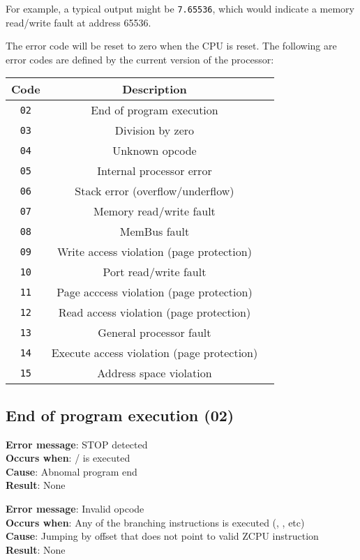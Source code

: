 For example, a typical output might be \texttt{7.65536}, which would indicate a memory read/write fault at address 65536.

The error code will be reset to zero when the CPU is reset. The following are error codes are defined by the current version of the processor:

\singlespacing
\begin{longtable}{|c|c|p{3.0in}|} \hline
Code & Description \\ \hline
\texttt{02} & End of program execution \\ \hline
\texttt{03} & Division by zero \\ \hline
\texttt{04} & Unknown opcode \\ \hline
\texttt{05} & Internal processor error \\ \hline
\texttt{06} & Stack error (overflow/underflow) \\ \hline
\texttt{07} & Memory read/write fault \\ \hline
\texttt{08} & MemBus fault \\ \hline
\texttt{09} & Write access violation (page protection) \\ \hline
\texttt{10} & Port read/write fault \\ \hline
\texttt{11} & Page acccess violation (page protection) \\ \hline
\texttt{12} & Read access violation (page protection) \\ \hline
\texttt{13} & General processor fault \\ \hline
\texttt{14} & Execute access violation (page protection) \\ \hline
\texttt{15} & Address space violation \\ \hline

\end{longtable}
\onehalfspacing

\newcommand{\errorentry}[4]{

\textbf{Error message}: #1 \\ \textbf{Occurs when}: #2 \\ \textbf{Cause}: #3 \\ \textbf{Result}: #4

\vspace{0.1in}

}

\subsection{End of program execution (02)}
\errorentry{STOP detected}
           {/ is executed}
           {Abnomal program end}
           {None}
\errorentry{Invalid opcode}
           {Any of the branching instructions is executed (\reg{JMP}, \reg{CALL}, etc)}
           {Jumping by offset that does not point to valid ZCPU instruction}
           {None}


